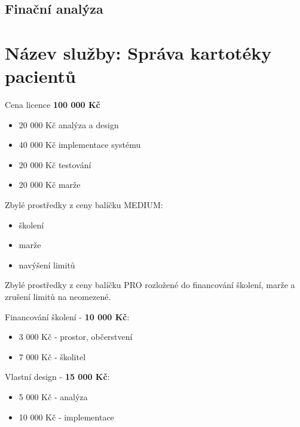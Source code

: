 \documentclass[11pt, a4paper, titlepage]{article}
\begin{document}
	
	\pagestyle{fancy}

	\begin{center}
		\section*{Finační analýza}
	\end{center}

	\section*{Název služby: Správa kartotéky pacientů}
	Cena licence \textbf{100 000 Kč}
	\begin{itemize}
		\item 20 000 Kč analýza a design
		\item 40 000 Kč implementace systému
		\item 20 000 Kč testování
		\item 20 000 Kč marže
	\end{itemize}
        Zbylé prostředky z ceny balíčku MEDIUM:
			\begin{itemize}
                \item školení
                \item marže
                \item navýšení limitů
            \end{itemize}
		Zbylé prostředky z ceny balíčku PRO rozložené do financování školení, marže a zrušení limitů na neomezené.

		Financování školení - \textbf{10 000 Kč}:
		\begin{itemize}
			\item 3 000 Kč - prostor, občerstvení
			\item 7 000 Kč - školitel
		\end{itemize}

		Vlastní design - \textbf{15 000 Kč}:
		\begin{itemize}
			\item 5 000 Kč - analýza
			\item 10 000 Kč - implementace
		\end{itemize}
\end{document}
